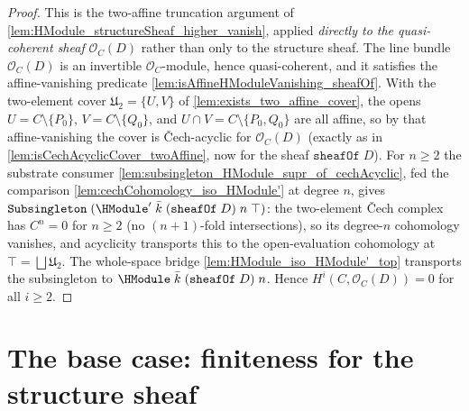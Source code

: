 \begin{proof}
  This is the two-affine truncation argument of
  \cref{lem:HModule_structureSheaf_higher_vanish}, applied
  \emph{directly to the quasi-coherent sheaf} \(\mathcal O_C(D)\) rather
  than only to the structure sheaf. The line bundle \(\mathcal O_C(D)\)
  is an invertible \(\mathcal O_C\)-module, hence quasi-coherent, and it
  satisfies the affine-vanishing predicate
  \cref{lem:isAffineHModuleVanishing_sheafOf}. With the two-element cover
  \(\mathfrak U_2 = \{U, V\}\) of \cref{lem:exists_two_affine_cover}, the
  opens \(U = C \setminus \{P_0\}\), \(V = C \setminus \{Q_0\}\), and
  \(U \cap V = C \setminus \{P_0, Q_0\}\) are all affine, so by that
  affine-vanishing the cover is Čech-acyclic for \(\mathcal O_C(D)\)
  (exactly as in \cref{lem:isCechAcyclicCover_twoAffine}, now for the
  sheaf \(\mathtt{sheafOf}\;D\)). For \(n \ge 2\) the substrate consumer
  \cref{lem:subsingleton_HModule_supr_of_cechAcyclic}, fed the comparison
  \cref{lem:cechCohomology_iso_HModule'} at degree \(n\), gives
  \(\mathtt{Subsingleton}\;(\HModule'\;\bar k\;(\mathtt{sheafOf}\;D)\;n\;
  \top)\): the two-element Čech complex has \(C^n = 0\) for \(n \ge 2\)
  (no \((n{+}1)\)-fold intersections), so its degree-\(n\) cohomology
  vanishes, and acyclicity transports this to the open-evaluation
  cohomology at \(\top = \bigsqcup \mathfrak U_2\). The whole-space bridge
  \cref{lem:HModule_iso_HModule'_top} transports the subsingleton to
  \(\HModule\;\bar k\;(\mathtt{sheafOf}\;D)\;n\). Hence
  \(H^i(C, \mathcal O_C(D)) = 0\) for all \(i \ge 2\).

\end{proof}

\section{The base case: finiteness for the structure sheaf}

